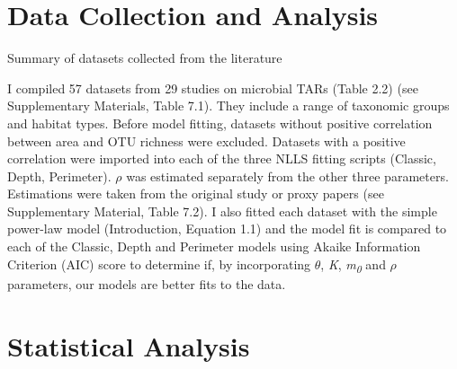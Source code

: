 {\section{Data Collection and Analysis}

\begin{table}[h!]
  \begin{center}
    \caption{Summary of datasets collected from the literature}
    \label{table2}
  \end{center}
\end{table}

\noindent I compiled 57 datasets from 29 studies on microbial TARs (Table 2.2) (see Supplementary Materials, Table 7.1). They include a range of taxonomic groups and habitat types. Before model fitting, datasets without positive correlation between area and OTU richness were excluded. Datasets with a positive correlation were imported into each of the three NLLS fitting scripts (Classic, Depth, Perimeter). $\rho$ was estimated separately from the other three parameters. Estimations were taken from the original study or proxy papers (see Supplementary Material, Table 7.2). I also fitted each dataset with the simple power-law model (Introduction, Equation 1.1) and the model fit is compared to each of the Classic, Depth and Perimeter models using Akaike Information Criterion (AIC) score to determine if, by incorporating $\theta$, \textit{K}, \textit{m\textsubscript{0}} and $\rho$ parameters, our models are better fits to the data. \\ 

\section{Statistical Analysis}

}
